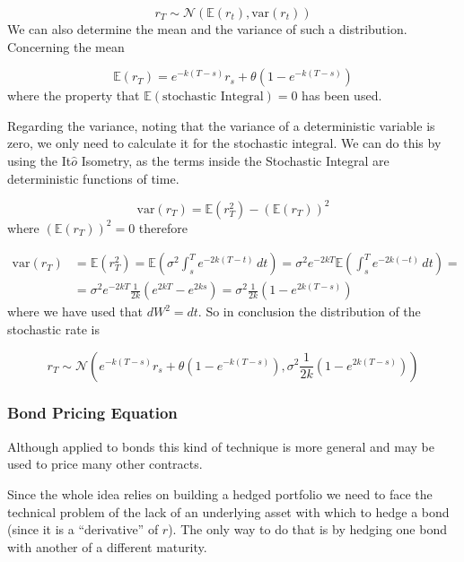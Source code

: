 \begin{equation*}
	r_T \sim \mathcal{N}(\mathbb{E}(r_t), \textrm{var}(r_t))
\end{equation*}
We can also determine the mean and the variance of such a distribution.
Concerning the mean

\begin{equation}
	\mathbb{E}(r_T)=e^{-k(T-s)} r_s+\theta\left(1-e^{-k(T-s)}\right)
\end{equation}
where the property that $\mathbb{E}(\textrm{stochastic~Integral}) = 0$ has been used.

Regarding the variance, noting that the variance of a deterministic variable is zero, we only need to calculate it for the stochastic integral. We can do this by using the It$\hat{o}$ Isometry, as the terms inside the Stochastic Integral are deterministic functions of time.

\begin{equation*}
	\textrm{var}(r_T)=\mathbb{E}(r^2_T)-(\mathbb{E}(r_T))^2
\end{equation*}
where $(\mathbb{E}(r_T))^2 = 0$ therefore

\begin{equation}
	\begin{aligned}
		\textrm{var}(r_T)&=\mathbb{E}(r^2_T)=\mathbb{E}(\sigma^2 \int^T_s e^{-2k(T-t)}\,dt)=\sigma^2 e^{-2kT} \mathbb{E}( \int^T_s e^{-2k(-t)}\,dt)=\\
		&=\sigma^2 e^{-2kT} \frac {1}{2k}(e^{2kT}-e^{2ks})=\sigma^2 \frac {1}{2k}(1-e^{2k(T-s)}) 
	\end{aligned}
\end{equation}
where we have used that $dW^2 = dt$.
So in conclusion the distribution of the stochastic rate is

\begin{equation}
	r_T \sim \mathcal{N}(e^{-k(T-s)} r_s+\theta(1-e^{-k(T-s)}),\sigma^2 \frac {1}{2k}(1-e^{2k(T-s)}))
\end{equation}

\subsubsection{Bond Pricing Equation}\label{bond-pricing-equation}

Although applied to bonds this kind of technique is more general and may be used to price many other contracts.

Since the whole idea relies on building a hedged portfolio we need to face the technical problem of the lack of an underlying asset with which
to hedge a bond (since it is a ``derivative'' of $r$). The only way to do that is by hedging one bond with another of a different maturity.

